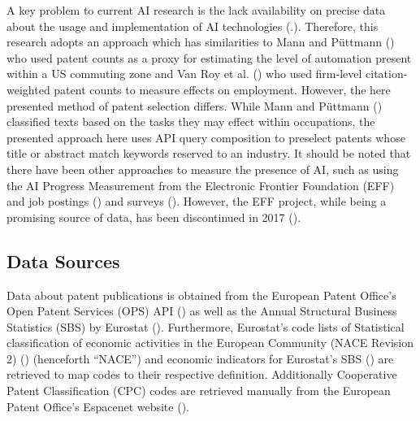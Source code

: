 \documentclass[
  12pt,
  a4paperpaper,
]{article}
\begin{document}
A key problem to current AI research is the lack availability on precise
data about the usage and implementation of AI technologies
(.).
Therefore, this research adopts an approach which has similarities to
Mann and Püttmann () who
used patent counts as a proxy for estimating the level of automation
present within a US commuting zone and Van Roy et al.
() who used firm-level
citation-weighted patent counts to measure effects on employment.
However, the here presented method of patent selection differs. While
Mann and Püttmann () classified
texts based on the tasks they may effect within occupations, the
presented approach here uses API query composition to preselect patents
whose title or abstract match keywords reserved to an industry. It
should be noted that there have been other approaches to measure the
presence of AI, such as using the AI Progress Measurement from the
Electronic Frontier Foundation (EFF) and job postings
() and
surveys (). However, the EFF project, while being a promising
source of data, has been discontinued in 2017
().

\subsection{Data Sources}\label{sec-data-sources}

Data about patent publications is obtained from the European Patent
Office's Open Patent Services (OPS) API
() as well as the Annual Structural Business Statistics (SBS) by
Eurostat
(). Furthermore, Eurostat's code lists of
Statistical classification of economic activities in the European
Community (NACE Revision 2)
() (henceforth ``NACE'') and economic
indicators for Eurostat's SBS
() are retrieved to map codes to their
respective definition. Additionally Cooperative Patent Classification
(CPC) codes are retrieved manually from the European Patent Office's
Espacenet website
().
\end{document}
